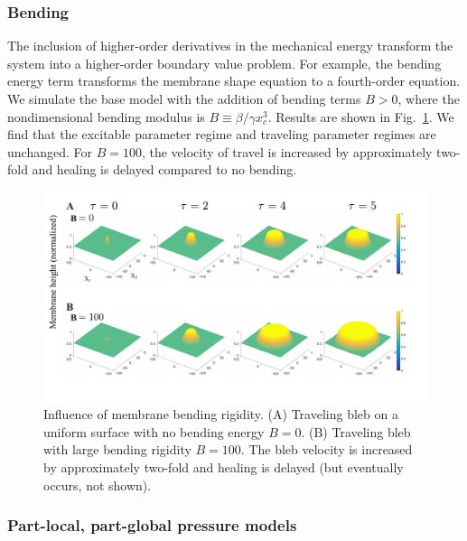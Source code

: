 \subsubsection{Bending}

The inclusion of higher-order derivatives in the mechanical energy transform the system into a higher-order boundary value problem. For example, the bending energy term transforms the membrane shape equation to a fourth-order equation. We simulate the base model with the addition of bending terms $B>0$, where the nondimensional bending modulus is $B \equiv \beta/\gamma x_c^3$.  Results are shown in Fig.~\ref{fig::bending}. We find that the excitable parameter regime and traveling parameter regimes are unchanged. For $B=100$, the velocity of travel is increased by approximately two-fold and healing is delayed compared to no bending. 

\begin{figure}[h!]
   \begin{center}
   \captionsetup{width=17cm}
     \includegraphics*[width=17cm,center]{Project1/figs/figBending}
      \caption{Influence of membrane bending rigidity. (A) Traveling bleb on a uniform surface with no bending energy $B=0$. (B) Traveling bleb with large bending rigidity $B = 100$. The bleb velocity is increased by approximately two-fold and healing is delayed (but eventually occurs, not shown). }
      \label{fig::bending}
   \end{center}
\end{figure}

\subsubsection{Part-local, part-global pressure models}

